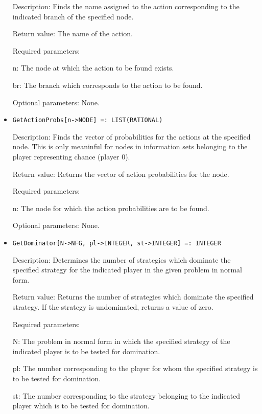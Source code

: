 \begin{itemize}
\bd
\item
[Description:] Finds the name assigned to the action corresponding to 
the indicated branch of the specified node.
\item   
[Return value:] The name of the action.
\item
[Required parameters:]\hfil\null
	
\bd
\item
[ n:] The node at which the action to be found exists.
\item
[ br:] The branch which corresponds to the action to be found.
\ed

\item
[Optional parameters:] None.
\ed

\item
\protect \large \begin{verbatim}
GetActionProbs[n->NODE] =: LIST(RATIONAL)
\end{verbatim}\normalsize

\bd
\item
[Description:] Finds the vector of probabilities for the actions at the
specified node.  This is only meaninful for nodes in information sets 
belonging to the player representing chance (player 0).
\item
[Return value:] Returns the vector of action probabilities for the node.
\item
[Required parameters:]\hfil\null
	
\bd
\item
[ n:] The node for which the action probabilities are to be found.
\ed

\item
[Optional parameters:] None.
\ed

\item
\protect \large \begin{verbatim}
GetDominator[N->NFG, pl->INTEGER, st->INTEGER] =: INTEGER
\end{verbatim}\normalsize

\bd
\item
[Description:] Determines the number of strategies which dominate the
specified strategy for the indicated player in the given problem in 
normal form.
\item
[Return value:] Returns the number of strategies which dominate the
specified strategy.  If the strategy is undominated, returns a value
of zero.  
\item
[Required parameters:]\hfil\null

\bd
\item
[ N:] The problem in normal form in which the specified strategy of
the indicated player is to be tested for domination.
\item
[ pl:] The number corresponding to the player for whom the specified
strategy is to be tested for domination.
\item
[ st:] The number corresponding to the strategy belonging to the 
indicated player which is to be tested for domination.
\ed


\end{itemize}
